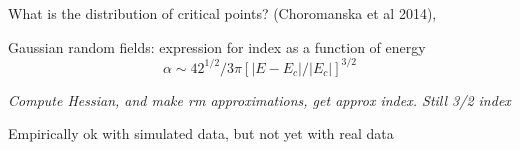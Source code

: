 \documentclass[english]{article}
\begin{document}
\item 
What is the distribution of critical  points? (Choromanska et al 2014), 

Gaussian random fields: expression for index as a function of energy $$\alpha \sim 42^{1/2}/3\pi [|E - E_c|/|E_c|]^{3/2}$$

\emph{Compute Hessian, and make rm approximations, get approx index. Still 3/2 index}

Empirically ok with simulated data, but not yet with real data
%
%
%
%
%
\eenum
\end{document}
